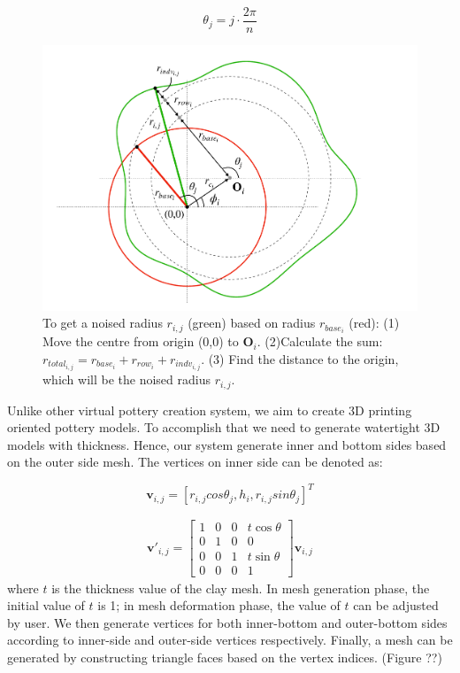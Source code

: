 \documentclass{svjour3}                     %
\begin{document}
\begin{equation}
\theta_{j} = j \cdot \frac{2\pi}{n}
\end{equation}

\begin{figure}
\includegraphics[width=\textwidth]{fig4.pdf}
\caption{To get a noised radius $r_{i,j}$ (green) based on radius $r_{base_{i}}$ (red): (1) Move the centre from origin (0,0) to $\mathbf{O}_{i}$. (2)Calculate the sum: $r_{total_{i,j}} = r_{base_{i}} + r_{row_{i}} + r_{indv_{i,j}}$. (3) Find the distance to the origin, which will be the noised radius $r_{i,j}$.}
\label{fig:4}
\end{figure}

Unlike other virtual pottery creation system, we aim to create 3D printing oriented pottery models. To accomplish that we need to generate watertight 3D models with thickness. Hence, our system generate inner and bottom sides based on the outer side mesh. The vertices on inner side can be denoted as:

\begin{equation}
\mathbf{v}_{i,j} =
\left[r_{i,j}  cos \theta_{j},
h_{i},
r_{i,j} sin \theta_{j}\right]^T
\end{equation}

\begin{equation}
\begin{split}
\mathbf{v'}_{i,j} = 
\begin{bmatrix}
1 & 0 & 0 & t\cos\theta \\
0 & 1 & 0 & 0\\ 
0 & 0 & 1 & t\sin\theta \\
0 & 0 & 0 & 1 
\end{bmatrix}
\mathbf{v}_{i,j}
\end{split}
\end{equation}
where $t$ is the thickness value of the clay mesh. In mesh generation phase, the initial value of $t$ is 1; in mesh deformation phase, the value of $t$ can be adjusted by user.
We then generate vertices for both inner-bottom and outer-bottom sides according to inner-side and outer-side vertices respectively. Finally, a mesh can be generated by constructing triangle faces based on the vertex indices. (Figure ??)
\end{document}
